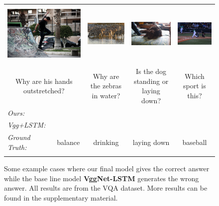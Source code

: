 \documentclass[10pt,journal,compsoc]{IEEEtran}
\begin{document}
\begin{figure}[t]
{\begin{tabular}{lcccc}
 \multicolumn{2}{c}{\includegraphics[height=3cm]{img/results/002.jpg}}&\includegraphics[height=3cm]{img/results/004.jpg}&\includegraphics[height=3cm]{img/results/005.jpg}&\includegraphics[height=3cm]{img/results/007.jpg}\\
 \multicolumn{2}{c}{Why are his hands outstretched?}&Why are the zebras in water?&Is the dog standing or laying down?&Which sport is this?\\ \hline
 \textit{Ours:} &\color{green}{balance}&\color{green}{drinking}&\color{green}{laying down}&\color{green}{baseball}\\
 \textit{Vgg+LSTM:} &\color{red}{play}&\color{red}{water}&\color{red}{sitting}&\color{red}{tennis}\\
 \textit{Ground Truth:} &balance&drinking&laying down&baseball\\ \Xhline{2\arrayrulewidth}
 \vspace{-3pt}
\end{tabular}}
%
%
%
%
%
%
%
%
%
%
%
%
%
%
%
%
%
%
%
%
%
%
%
%
%
%
%
\vspace{-7pt}
\caption{Some example cases where our final model gives the correct answer while the base line model \textbf{VggNet-LSTM} generates the wrong answer. All results are from the VQA dataset. More results can be found in the supplementary material.}
\label{results_examples}
\vspace{-15pt}
\end{figure}
\ifCLASSOPTIONcaptionsoff
  \newpage
\fi
%
%
\end{document}
